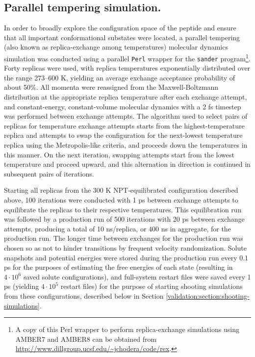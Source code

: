 \subsection{Parallel tempering simulation.}
\label{validation:section:parallel-tempering}

In order to broadly explore the configuration space of the peptide and ensure that all important conformational substates were located, a parallel tempering (also known as replica-exchange among temperatures) molecular dynamics simulation \cite{sugita:1999a} was conducted using a parallel {\tt Perl} wrapper for the {\tt sander} program\footnote{A copy of this Perl wrapper to perform replica-exchange simulations using AMBER7 and AMBER8 can be obtained from \url{http://www.dillgroup.ucsf.edu/~jchodera/code/rex}.}.
Forty replicas were used, with replica temperatures exponentially distributed over the range 273--600 K, yielding an average exchange acceptance probability of about 50\%.
All momenta were reassigned from the Maxwell-Boltzmann distribution at the appropriate replica temperature after each exchange attempt, and constant-energy, constant-volume molecular dynamics with a 2 fs timestep was performed between exchange attempts.
The algorithm used to select pairs of replicas for temperature exchange attempts starts from the highest-temperature replica and attempts to swap the configuration for the next-lowest temperature replica using the Metropolis-like criteria, and proceeds down the temperatures in this manner.  On the next iteration, swapping attempts start from the lowest temperature and proceed upward, and this alternation in direction is continued in subsequent pairs of iterations.

Starting all replicas from the 300 K NPT-equilibrated configuration described above, 100 iterations were conducted with 1 ps between exchange attempts to equilibrate the replicas to their respective temperatures.  
This equilibration run was followed by a production run of 500 iterations with 20 ps between exchange attempts, producing a total of 10 ns/replica, or 400 ns in aggregate, for the production run. 
The longer time between exchanges for the production run was chosen so as not to hinder transitions by frequent velocity randomization.  
Solute snapshots and potential energies were stored during the production run every 0.1 ps for the purposes of estimating the free energies of each state (resulting in $4\cdot10^6$ saved solute configurations), and full-system restart files were saved every 1 ps (yielding $4\cdot10^5$ restart files) for the purpose of starting shooting simulations from these configurations, described below in Section \ref{validation:section:shooting-simulations}.

